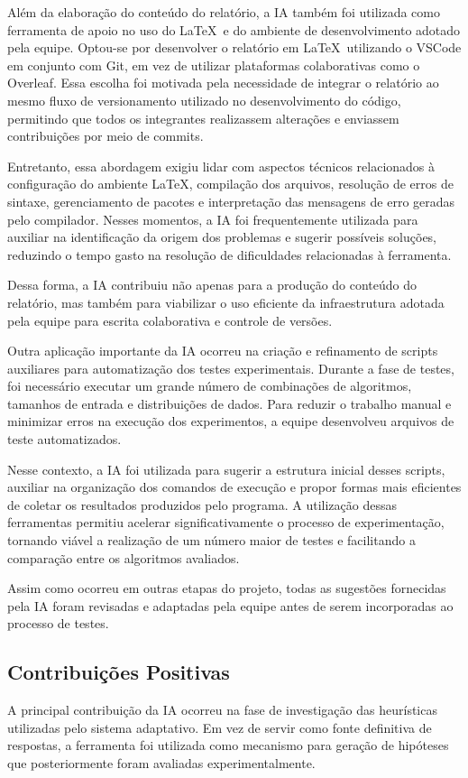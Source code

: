 \documentclass{article}
\begin{document}
Além da elaboração do conteúdo do relatório, a IA também foi utilizada como ferramenta de apoio no uso do \LaTeX\ e do ambiente de desenvolvimento adotado pela equipe. Optou-se por desenvolver o relatório em \LaTeX\ utilizando o VSCode em conjunto com Git, em vez de utilizar plataformas colaborativas como o Overleaf. Essa escolha foi motivada pela necessidade de integrar o relatório ao mesmo fluxo de versionamento utilizado no desenvolvimento do código, permitindo que todos os integrantes realizassem alterações e enviassem contribuições por meio de commits.

Entretanto, essa abordagem exigiu lidar com aspectos técnicos relacionados à configuração do ambiente \LaTeX, compilação dos arquivos, resolução de erros de sintaxe, gerenciamento de pacotes e interpretação das mensagens de erro geradas pelo compilador. Nesses momentos, a IA foi frequentemente utilizada para auxiliar na identificação da origem dos problemas e sugerir possíveis soluções, reduzindo o tempo gasto na resolução de dificuldades relacionadas à ferramenta.

Dessa forma, a IA contribuiu não apenas para a produção do conteúdo do relatório, mas também para viabilizar o uso eficiente da infraestrutura adotada pela equipe para escrita colaborativa e controle de versões.

Outra aplicação importante da IA ocorreu na criação e refinamento de scripts auxiliares para automatização dos testes experimentais. Durante a fase de testes, foi necessário executar um grande número de combinações de algoritmos, tamanhos de entrada e distribuições de dados. Para reduzir o trabalho manual e minimizar erros na execução dos experimentos, a equipe desenvolveu arquivos de teste automatizados.

Nesse contexto, a IA foi utilizada para sugerir a estrutura inicial desses scripts, auxiliar na organização dos comandos de execução e propor formas mais eficientes de coletar os resultados produzidos pelo programa. A utilização dessas ferramentas permitiu acelerar significativamente o processo de experimentação, tornando viável a realização de um número maior de testes e facilitando a comparação entre os algoritmos avaliados.

Assim como ocorreu em outras etapas do projeto, todas as sugestões fornecidas pela IA foram revisadas e adaptadas pela equipe antes de serem incorporadas ao processo de testes.


\subsection{Contribuições Positivas}
A principal contribuição da IA ocorreu na fase de investigação das heurísticas utilizadas pelo sistema adaptativo. Em vez de servir como fonte definitiva de respostas, a ferramenta foi utilizada como mecanismo para geração de hipóteses que posteriormente foram avaliadas experimentalmente.
\end{document}
